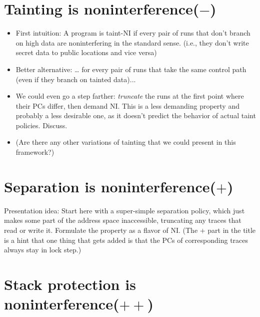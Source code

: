 \documentclass[conference]{IEEEtran}
\begin{document}
\section{Tainting is noninterference($-$)}

\begin{itemize}
\item First intuition: A program is taint-NI if every pair of runs that don’t
branch on high data are noninterfering in the standard sense.  (i.e., they
don't write secret data to public locations and vice versa)
\item Better alternative: … for every pair of runs that take the same control path (even if they branch on tainted data)...
\item We could even go a step farther: {\em truncate} the runs at the
  first point where their PCs differ, then demand NI.  This is a less
  demanding property and probably a less desirable one, as it doesn't
  predict the behavior of actual taint policies.  Discuss.
\item (Are there any other variations of tainting that we could present in
this framework?)
\end{itemize}


\section{Separation is noninterference($+$)}

Presentation idea: Start here with a super-simple separation policy, which
just makes some part of the address space inaccessible, truncating any
traces that read or write it.  Formulate the property as a flavor of NI.
(The $+$ part in the title is a hint that one thing that gets added is that
the PCs of corresponding traces always stay in lock step.)

\section{Stack protection is noninterference($++$)}
\end{document}
